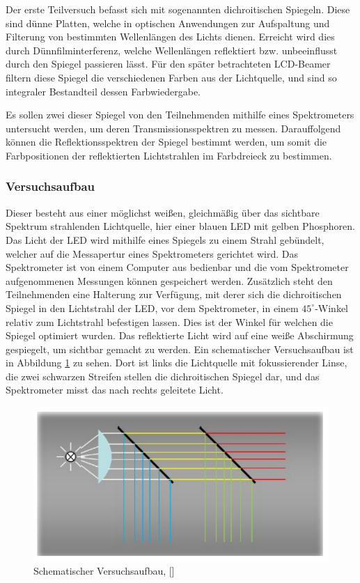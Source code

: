 
Der erste Teilversuch befasst sich mit sogenannten dichroitischen Spiegeln. Diese sind dünne Platten, welche in optischen Anwendungen zur Aufspaltung und Filterung von bestimmten Wellenlängen des Lichts dienen. Erreicht wird dies durch Dünnfilminterferenz, welche Wellenlängen reflektiert bzw. unbeeinflusst durch den Spiegel passieren lässt. Für den später betrachteten LCD-Beamer filtern diese Spiegel die verschiedenen Farben aus der Lichtquelle, und sind so integraler Bestandteil dessen Farbwiedergabe.

Es sollen zwei dieser Spiegel von den Teilnehmenden mithilfe eines Spektrometers untersucht werden, um deren Transmissionsspektren zu messen. Darauffolgend können die Reflektionsspektren der Spiegel bestimmt werden, um somit die Farbpositionen der reflektierten Lichtstrahlen im Farbdreieck zu bestimmen.

\subsubsection{Versuchsaufbau} Dieser besteht aus einer möglichst weißen, gleichmäßig über das sichtbare Spektrum strahlenden Lichtquelle, hier einer blauen LED mit gelben Phosphoren. Das Licht der LED wird mithilfe eines Spiegels zu einem Strahl gebündelt, welcher auf die Messapertur eines Spektrometers gerichtet wird. Das Spektrometer ist von einem Computer aus bedienbar und die vom Spektrometer aufgenommenen Messungen können gespeichert werden. Zusätzlich steht den Teilnehmenden eine Halterung zur Verfügung, mit derer sich die dichroitischen Spiegel in den Lichtstrahl der LED, vor dem Spektrometer, in einem $45^\circ$-Winkel relativ zum Lichtstrahl befestigen lassen. Dies ist der Winkel für welchen die Spiegel optimiert wurden. Das reflektierte Licht wird auf eine weiße Abschirmung gespiegelt, um sichtbar gemacht zu werden. Ein schematischer Versuchsaufbau ist in Abbildung \ref{abb:V1_AUFBAU} zu sehen. Dort ist links die Lichtquelle mit fokussierender Linse, die zwei schwarzen Streifen stellen die dichroitischen Spiegel dar, und das Spektrometer misst das nach rechts geleitete Licht.

\begin{figure}[h]
	\centering
	\includegraphics[scale=0.4]{Images/Aufbau.png}
	\caption{Schematischer Versuchsaufbau, [\cite[Abb. 3.2]{AML_SKRIPT}]}
	\label{abb:V1_AUFBAU}
\end{figure}

